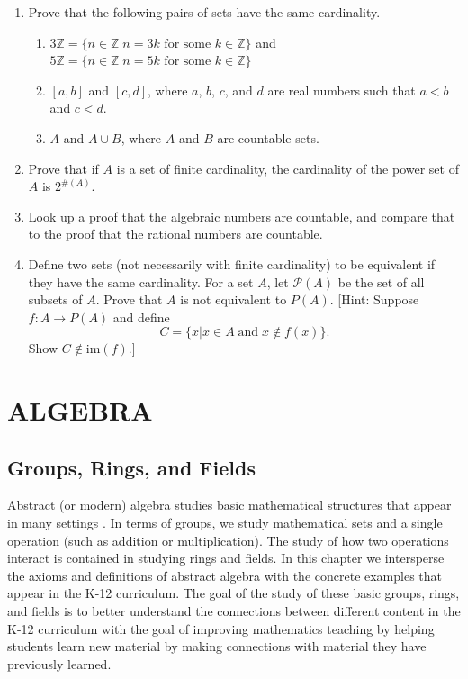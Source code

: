 \documentclass[
]{book}
\providecommand{\tightlist}{%
  \setlength{\itemsep}{0pt}\setlength{\parskip}{0pt}}
\theoremstyle{definition}
\theoremstyle{definition}
\theoremstyle{definition}
\theoremstyle{remark}
\begin{document}
\begin{enumerate}
\def\labelenumi{\arabic{enumi}.}
\item
  Prove that the following pairs of sets have the same cardinality.

  \begin{enumerate}
  \def\labelenumii{\alph{enumii}.}
  \tightlist
  \item
    \(3\mathbb{Z} = \{n\in \mathbb{Z}\vert n=3k \mbox{ for some } k\in \mathbb{Z}\}\) and \(5\mathbb{Z} = \{n\in \mathbb{Z}\vert n=5k \mbox{ for some } k\in \mathbb{Z}\}\)
  \item
    \([a,b]\) and \([c,d]\), where \(a\), \(b\), \(c\), and \(d\) are real numbers such that \(a<b\) and \(c<d\).
  \item
    \(A\) and \(A\cup B\), where \(A\) and \(B\) are countable sets.
  \end{enumerate}
\item
  Prove that if \(A\) is a set of finite cardinality, the cardinality of the power set of \(A\) is \(2^{\#(A)}\).
\item
  Look up a proof that the algebraic numbers are countable, and compare that to the proof that the rational numbers are countable.
\item
  Define two sets (not necessarily with finite cardinality) to be equivalent if they have the same cardinality.
  For a set \(A\), let \(\mathcal{P}(A)\) be the set of all subsets of \(A\). Prove that \(A\) is not equivalent to \(P(A)\). {[}Hint: Suppose \(f:A\rightarrow P(A)\) and define \[C=\{ x\vert  x\in A \; \mbox{and} \; x\not \in f(x) \}.\] Show \(C\not \in \mbox{im}(f)\).{]}
\end{enumerate}

\hypertarget{part-algebra}{%
\part{ALGEBRA}\label{part-algebra}}

\hypertarget{ch:group-1}{%
\chapter{Groups, Rings, and Fields}\label{ch:group-1}}

Abstract (or modern) algebra studies basic mathematical structures that appear in many settings . In terms of groups, we study mathematical sets and a single operation (such as addition or multiplication). The study of how two operations interact is contained in studying rings and fields. In this chapter we intersperse the axioms and definitions of abstract algebra with the concrete examples that appear in the K-12 curriculum. The goal of the study of these basic groups, rings, and fields is to better understand the connections between different content in the K-12 curriculum with the goal of improving mathematics teaching by helping students learn new material by making connections with material they have previously learned.
\end{document}
